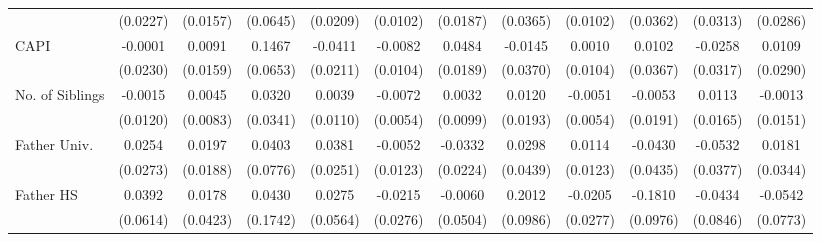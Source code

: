 \begin{table}[htbp]
\begin{tabular}{l*{11}{c}}
            &    (0.0227)         &    (0.0157)         &    (0.0645)         &    (0.0209)         &    (0.0102)         &    (0.0187)         &    (0.0365)         &    (0.0102)         &    (0.0362)         &    (0.0313)         &    (0.0286)         \\
\addlinespace
CAPI        &     -0.0001         &      0.0091         &      0.1467\sym{*}  &     -0.0411         &     -0.0082         &      0.0484\sym{*}  &     -0.0145         &      0.0010         &      0.0102         &     -0.0258         &      0.0109         \\
            &    (0.0230)         &    (0.0159)         &    (0.0653)         &    (0.0211)         &    (0.0104)         &    (0.0189)         &    (0.0370)         &    (0.0104)         &    (0.0367)         &    (0.0317)         &    (0.0290)         \\
\addlinespace
No. of Siblings&     -0.0015         &      0.0045         &      0.0320         &      0.0039         &     -0.0072         &      0.0032         &      0.0120         &     -0.0051         &     -0.0053         &      0.0113         &     -0.0013         \\
            &    (0.0120)         &    (0.0083)         &    (0.0341)         &    (0.0110)         &    (0.0054)         &    (0.0099)         &    (0.0193)         &    (0.0054)         &    (0.0191)         &    (0.0165)         &    (0.0151)         \\
\addlinespace
Father Univ.&      0.0254         &      0.0197         &      0.0403         &      0.0381         &     -0.0052         &     -0.0332         &      0.0298         &      0.0114         &     -0.0430         &     -0.0532         &      0.0181         \\
            &    (0.0273)         &    (0.0188)         &    (0.0776)         &    (0.0251)         &    (0.0123)         &    (0.0224)         &    (0.0439)         &    (0.0123)         &    (0.0435)         &    (0.0377)         &    (0.0344)         \\
\addlinespace
Father HS   &      0.0392         &      0.0178         &      0.0430         &      0.0275         &     -0.0215         &     -0.0060         &      0.2012\sym{*}  &     -0.0205         &     -0.1810         &     -0.0434         &     -0.0542         \\
            &    (0.0614)         &    (0.0423)         &    (0.1742)         &    (0.0564)         &    (0.0276)         &    (0.0504)         &    (0.0986)         &    (0.0277)         &    (0.0976)         &    (0.0846)         &    (0.0773)         \\

\end{tabular}
\end{table}
